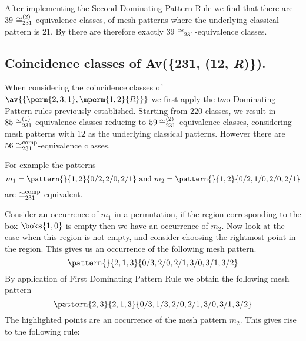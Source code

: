 After implementing the Second Dominating Pattern Rule we find that there are
\(39\) \(\coinc[(2)]{231}\)-equivalence classes, of mesh patterns where the
underlying classical pattern is \(21\). By  there are
therefore exactly \(39\) \(\coinc{231}\)-equivalence classes.

\subsection{Coincidence classes of Av(\{231, (12, \textit{R})\}).}
When considering the coincidence classes of
\(\av{\{\perm{2,3,1},\mperm{1,2}{R}\}}\) we first apply the two Dominating
Pattern rules previously established. Starting from \(220\) classes, we result
in \(85 \coinc[(1)]{231}\)-equivalence classes reducing to \(59
\coinc[(2)]{231}\)-equivalence classes, considering mesh patterns with \(12\) as
the underlying classical patterns. However there are
\(56 \coinc[comp]{231}\)-equivalence classes.

For example the patterns
\begin{equation*}
    m_1 = \pattern{}{1,2}{0/2,2/0,2/1} \text{ and } m_2 = \pattern{}{1,2}{0/2,1/0,2/0,2/1}
\end{equation*}
are \(\coinc[comp]{231}\)-equivalent.

Consider an occurrence of \(m_1\) in a permutation, if the region corresponding
to the box \(\boks{1,0}\) is empty then we have an occurrence of \(m_2\). Now
look at the case when this region is not empty, and consider choosing the
rightmost point in the region. This gives us an occurrence of the following mesh
pattern.
\begin{equation*}
    \pattern{}{2,1,3}{0/3,2/0,2/1,3/0,3/1,3/2}
\end{equation*}
By application of First Dominating Pattern Rule we obtain the following mesh
pattern
\begin{equation*}
    \pattern{2,3}{2,1,3}{0/3,1/3,2/0,2/1,3/0,3/1,3/2}
\end{equation*}
The highlighted points are an occurrence of the mesh pattern \(m_2\). This gives
rise to the following rule:

